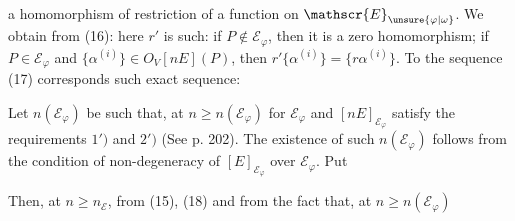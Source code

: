 a homomorphism of restriction of a function on $\mathscr{E}_{\unsure{\varphi|\omega}}$. We obtain from (16):
here $r'$ is such: if $P\notin\mathscr{E}_{\varphi}$, then it is a zero homomorphism; if $P\in\mathscr{E}_{\varphi}$ and $\{\alpha^{(i)}\}\in O_V[nE](P)$, then $r'\{\alpha^{(i)}\}=\{r\alpha^{(i)}\}$. To the sequence (17) corresponds such exact sequence:

Let $n(\mathscr{E}_{\varphi})$ be such that, at $n\geq n(\mathscr{E}_{\varphi})$ for $\mathscr{E}_{\varphi}$ and $[nE]_{\mathscr{E}_{\varphi}}$ satisfy the requirements $1')$ and $2')$ (See p. 202). The existence of such $n(\mathscr{E}_{\varphi})$ follows from the condition of non-degeneracy of $[E]_{\mathscr{E}_{\varphi}}$ over $\mathscr{E}_{\varphi}$. Put
\handwritten{\[
n_{\mathscr{E}}=\max(n'',\,n(\mathscr{E}_{\varphi})).
\]}

Then, at $n\geq n_{\mathscr{E}}$, from (15), (18) and from the fact that, at $n\geq n(\mathscr{E}_{\varphi})$
